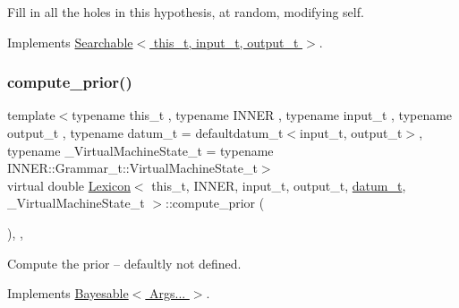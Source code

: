 Fill in all the holes in this hypothesis, at random, modifying self. 



Implements \hyperlink{class_searchable_a29ab2eb0471e2e9d96d39f0349f21571}{Searchable$<$ this\+\_\+t, input\+\_\+t, output\+\_\+t $>$}.

\mbox{\label{class_lexicon_a73e4205ac7b0e6f4f207e5d71dea1910}} 
\subsubsection{\texorpdfstring{compute\+\_\+prior()}{compute\_prior()}}
{\footnotesize\ttfamily template$<$typename this\+\_\+t , typename I\+N\+N\+ER , typename input\+\_\+t , typename output\+\_\+t , typename datum\+\_\+t  = defaultdatum\+\_\+t$<$input\+\_\+t, output\+\_\+t$>$, typename \+\_\+\+Virtual\+Machine\+State\+\_\+t  = typename I\+N\+N\+E\+R\+::\+Grammar\+\_\+t\+::\+Virtual\+Machine\+State\+\_\+t$>$ \\
virtual double \hyperlink{class_lexicon}{Lexicon}$<$ this\+\_\+t, I\+N\+N\+ER, input\+\_\+t, output\+\_\+t, \hyperlink{class_bayesable_a9f1a6c0cd7855550fa10b1a8f13a5867}{datum\+\_\+t}, \+\_\+\+Virtual\+Machine\+State\+\_\+t $>$\+::compute\+\_\+prior (\begin{DoxyParamCaption}{ }\end{DoxyParamCaption})\hspace{0.3cm}{\ttfamily [inline]}, {\ttfamily [override]}, {\ttfamily [virtual]}}



Compute the prior -- defaultly not defined. 



Implements \hyperlink{class_bayesable_a1b057a17212ced123545133e2297c01b}{Bayesable$<$ Args... $>$}.

\mbox{\label{class_lexicon_a283893cb37705bd6421fb3a1dc94432f}} 
